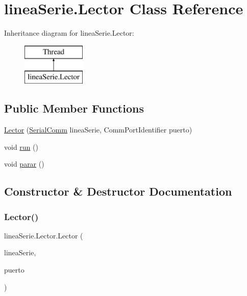 \hypertarget{classlinea_serie_1_1_lector}{}\section{linea\+Serie.\+Lector Class Reference}
\label{classlinea_serie_1_1_lector}
Inheritance diagram for linea\+Serie.\+Lector\+:\begin{figure}[H]
\begin{center}
\leavevmode
\includegraphics[height=2.000000cm]{classlinea_serie_1_1_lector}
\end{center}
\end{figure}
\subsection*{Public Member Functions}
\begin{DoxyCompactItemize}
\item 
\mbox{\hyperlink{classlinea_serie_1_1_lector_acc6d3613c77236bf1ded6d1e1702d7a0}{Lector}} (\mbox{\hyperlink{classlinea_serie_1_1_serial_comm}{Serial\+Comm}} linea\+Serie, Comm\+Port\+Identifier puerto)
\item 
void \mbox{\hyperlink{classlinea_serie_1_1_lector_abae20cd464d8a754ae303c0465edc283}{run}} ()
\item 
void \mbox{\hyperlink{classlinea_serie_1_1_lector_a509803a17c2a813a3b9b81379697cfb0}{parar}} ()
\end{DoxyCompactItemize}


\subsection{Constructor \& Destructor Documentation}
\mbox{\label{classlinea_serie_1_1_lector_acc6d3613c77236bf1ded6d1e1702d7a0}} 
\subsubsection{\texorpdfstring{Lector()}{Lector()}}
{\footnotesize\ttfamily linea\+Serie.\+Lector.\+Lector (\begin{DoxyParamCaption}\item[{\mbox{\hyperlink{classlinea_serie_1_1_serial_comm}{Serial\+Comm}}}]{linea\+Serie,  }\item[{Comm\+Port\+Identifier}]{puerto }\end{DoxyParamCaption})}



